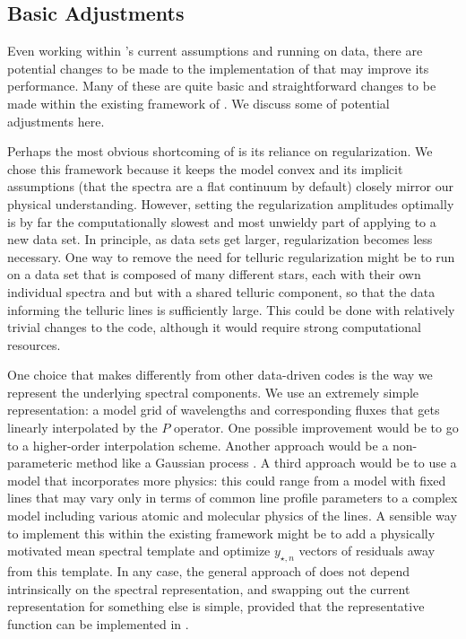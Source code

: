\documentclass[modern]{aastex62}
\begin{document}
\subsection{Basic Adjustments}
\label{s:improvements}

Even working within \wobble's current assumptions and running on \HARPS data, there are potential changes to be made to the implementation of \wobble that may improve its performance. 
Many of these are quite basic and straightforward changes to be made within the existing framework of \wobble. 
We discuss some of potential adjustments here.

Perhaps the most obvious shortcoming of \wobble is its reliance on regularization. 
We chose this framework because it keeps the model convex and its implicit assumptions (that the spectra are a flat continuum by default) closely mirror our physical understanding. 
However, setting the regularization amplitudes optimally is by far the computationally slowest and most unwieldy part of applying \wobble to a new data set. 
In principle, as data sets get larger, regularization becomes less necessary. 
One way to remove the need for telluric regularization might be to run on a data set that is composed of many different stars, each with their own individual spectra and \RVs but with a shared telluric component, so that the data informing the telluric lines is sufficiently large. 
This could be done with relatively trivial changes to the \wobble code, although it would require strong computational resources.

One choice that \wobble makes differently from other data-driven \RV codes is the way we represent the underlying spectral components. 
We use an extremely simple representation: a model grid of wavelengths and corresponding fluxes that gets linearly interpolated by the $P$ operator. 
One possible improvement would be to go to a higher-order interpolation scheme. 
Another approach would be a non-parameteric method like a Gaussian process \citep[as in][]{Czekala2017}. 
A third approach would be to use a model that incorporates more physics: this could range from a model with fixed lines that may vary only in terms of common line profile parameters to a complex model including various atomic and molecular physics of the lines. 
A sensible way to implement this within the existing \wobble framework might be to add a physically motivated mean spectral template and optimize $y_{\star, n}$ vectors of residuals away from this template. 
In any case, the general approach of \wobble does not depend intrinsically on the spectral representation, and swapping out the current representation for something else is simple, provided that the representative function can be implemented in \TF.
\end{document}
